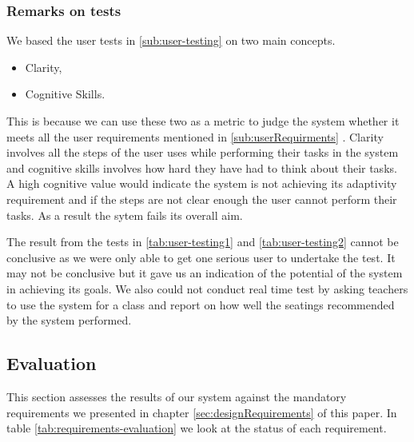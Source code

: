 \subsubsection{Remarks on tests}
We based the user tests in  \ref{sub:user-testing} on two main concepts.
\begin{itemize}
    \item Clarity,
    \item Cognitive Skills.
\end{itemize}
This is because we can use these two as a metric to judge the system whether it meets all the user requirements mentioned in \ref{sub:userRequirments} . Clarity involves all the steps of the user uses while performing their tasks in the system and cognitive skills involves how hard they have had to think about their tasks. A high cognitive value would indicate the system is not achieving its adaptivity requirement and if the steps are not clear enough the user cannot perform their tasks. As a result the sytem fails its overall aim.

The result from the tests in \ref{tab:user-testing1} and \ref{tab:user-testing2} cannot be conclusive as we were only able to get one serious user to undertake the test. It may not be conclusive but it gave us an indication of the potential of the system in achieving its goals. We also could not conduct real time test by asking teachers to use the system for a class and report on how well the seatings recommended by the system performed.

\subsection{Evaluation}
This section assesses the results of our system against the mandatory requirements we presented in chapter \ref{sec:designRequirements} of this paper. In table \ref{tab:requirements-evaluation} we look at the status of each requirement.

